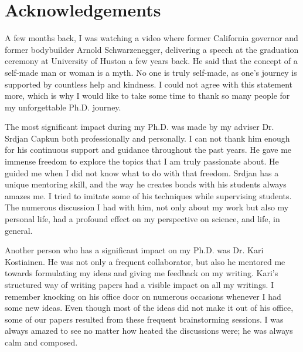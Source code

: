 
\bigskip

\begingroup
\let\clearpage\relax
\let\cleardoublepage\relax
\let\cleardoublepage\relax
\chapter*{Acknowledgements}

\def\thanks#1{%
\begingroup
\leftskip1em
\noindent #1
\par
\endgroup
}

A few months back, I was watching a video where former California governor and former bodybuilder Arnold Schwarzenegger, delivering a speech at the graduation ceremony at University of Huston a few years back. He said that the concept of a self-made man or woman is a myth. No one is truly self-made, as one's journey is supported by countless help and kindness. I could not agree with this statement more, which is why I would like to take some time to thank so many people for my unforgettable Ph.D. journey.


The most significant impact during my Ph.D. was made by my adviser Dr. Srdjan Capkun both professionally and personally. I can not thank him enough for his continuous support and guidance throughout the past years. He gave me immense freedom to explore the topics that I am truly passionate about. He guided me when I did not know what to do with that freedom. Srdjan has a unique mentoring skill, and the way he creates bonds with his students always amazes me. I tried to imitate some of his techniques while supervising students. The numerous discussion I had with him, not only about my work but also my personal life, had a profound effect on my perspective on science, and life, in general.


Another person who has a significant impact on my Ph.D. was Dr. Kari Kostiainen. He was not only a frequent collaborator, but also he mentored me towards formulating my ideas and giving me feedback on my writing.  Kari's structured way of writing papers had a visible impact on all my writings. I remember knocking on his office door on numerous occasions whenever I had some new ideas. Even though most of the ideas did not make it out of his office, some of our papers resulted from these frequent brainstorming sessions. I was always amazed to see no matter how heated the discussions were; he was always calm and composed.


